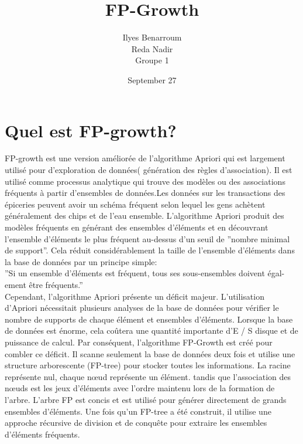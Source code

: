 \documentclass[a4paper,12pt]{article}
\author{Ilyes Benarroum \\
Reda Nadir \\
Groupe 1
}
\title{FP-Growth}
\date{September 27}
\begin{document}
\maketitle
\section{Quel est FP-growth?}
FP-growth est une version améliorée de l'algorithme Apriori qui est largement utilisé pour d'exploration de données( génération des règles d'association). Il est utilisé comme processus analytique qui trouve des modèles ou des associations fréquents à partir d'ensembles de données.Les données sur les transactions des épiceries peuvent avoir un schéma fréquent selon lequel les gens achètent généralement des chips et de l'eau ensemble. L'algorithme Apriori produit des modèles fréquents en générant des ensembles d'éléments et en découvrant l'ensemble d'éléments le plus fréquent au-dessus d'un seuil de ''nombre minimal de support''.
Cela réduit considérablement la taille de l'ensemble d'éléments dans la base de données par un principe simple:\\

''Si un ensemble d'éléments est fréquent, tous ses sous-ensembles doivent égal-ement être fréquents.''\\

Cependant, l'algorithme Apriori présente un déficit majeur. L'utilisation d'Apriori nécessitait plusieurs analyses de la base de données pour vérifier le nombre de supports de chaque élément et ensembles d'éléments.
Lorsque la base de données est énorme, cela coûtera une quantité importante d'E / S disque et de puissance de calcul. Par conséquent, l'algorithme FP-Growth est créé pour combler ce déficit. Il scanne seulement la base de données deux fois et utilise une structure arborescente (FP-tree) pour stocker toutes les informations. La racine représente nul, chaque nœud représente un élément.
tandis que l'association des nœuds est les jeux d'éléments avec l'ordre maintenu lors de la formation de l'arbre. L'arbre FP est concis et est utilisé pour générer directement de grands ensembles d'éléments. Une fois qu'un FP-tree a été construit, il utilise une approche récursive de division et de conquête pour extraire les ensembles d'éléments fréquents.
\pagebreak
\end{document}
